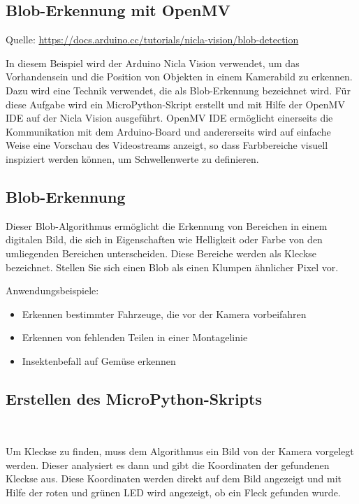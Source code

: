 

\subsection{Blob-Erkennung mit OpenMV}

{\tiny Quelle: \textcolor{blue}{\url{https://docs.arduino.cc/tutorials/nicla-vision/blob-detection}}}



In diesem Beispiel wird der Arduino Nicla Vision verwendet, um das Vorhandensein und die Position von Objekten in einem Kamerabild zu erkennen. Dazu wird eine Technik verwendet, die als Blob-Erkennung bezeichnet wird. Für diese Aufgabe wird ein MicroPython-Skript erstellt und mit Hilfe der OpenMV IDE auf der Nicla Vision ausgeführt. OpenMV IDE ermöglicht einerseits die Kommunikation mit dem Arduino-Board und andererseits wird auf einfache Weise eine Vorschau des Videostreams anzeigt, so dass Farbbereiche visuell inspiziert werden können, um Schwellenwerte zu definieren. 

\subsection{Blob-Erkennung}

Dieser Blob-Algorithmus  ermöglicht die Erkennung von Bereichen in einem digitalen Bild, die sich in Eigenschaften wie Helligkeit oder Farbe von den umliegenden Bereichen unterscheiden. Diese Bereiche werden als Kleckse bezeichnet. Stellen Sie sich einen Blob als einen Klumpen ähnlicher Pixel vor.

\bigskip

Anwendungsbeispiele:

\bigskip

\begin{itemize}
  \item Erkennen bestimmter Fahrzeuge, die vor der Kamera vorbeifahren
  \item Erkennen von fehlenden Teilen in einer Montagelinie
  \item Insektenbefall auf Gemüse erkennen
\end{itemize}
  
\subsection{Erstellen des MicroPython-Skripts}\ 
  
Um Kleckse zu finden, muss dem Algorithmus ein Bild von der Kamera vorgelegt werden. Dieser analysiert es dann und gibt die Koordinaten der gefundenen Kleckse aus. Diese Koordinaten werden direkt auf dem Bild angezeigt und mit Hilfe der roten und grünen LED wird angezeigt, ob ein Fleck gefunden wurde.

